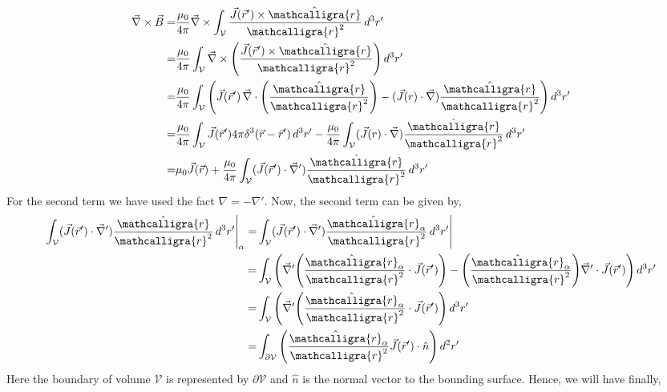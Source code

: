 \documentclass{article}
\newcommand{\scriptr}{\mathord{\mathcalligra{r}}}
\begin{document}
\begin{equation*}
    \begin{split}
        \vec{\nabla}\times \vec{B} = & \frac{\mu_0}{4\pi}\vec{\nabla}\times \int_{\mathcal{V}} \frac{\vec{J}(\vec{r}')\times\hat{\scriptr}}{\scriptr^2}\, d^3r'\\
        = &  \frac{\mu_0}{4\pi} \int_{\mathcal{V}} \vec{\nabla}\times \Bigg(\frac{\vec{J}(\vec{r}')\times \hat{\scriptr}}{\scriptr^2}\Bigg)\, d^3r'\\
        = &  \frac{\mu_0}{4\pi} \int_{\mathcal{V}} \Bigg( \vec{J}(\vec{r}') \, \vec{\nabla}\cdot \Bigg(\frac{\hat{\scriptr}}{\scriptr^2}\Bigg) - (\vec{J}(r)\cdot \vec{\nabla})\frac{\hat{\scriptr}}{\scriptr^2}\Bigg)\, d^3r'\\
        = & \frac{\mu_0}{4\pi} \int_{\mathcal{V}} \vec{J}(\vec{r}')4\pi \delta^3(\vec{r}-\vec{r}')\, d^3r' -  \frac{\mu_0}{4\pi} \int_{\mathcal{V}} (\vec{J}(r)\cdot \vec{\nabla})\frac{\hat{\scriptr}}{\scriptr^2}\, d^3r'\\
        = & \mu_0 \vec{J}(\vec{r}) + \frac{\mu_0}{4\pi}\int_{\mathcal{V}}(\vec{J}(\vec{r}')\cdot \vec{\nabla}')\frac{\hat{\scriptr}}{\scriptr^2}\, d^3 r'
    \end{split}
\end{equation*}
For the second term we have used the fact $\nabla = - \nabla'$. Now, the second term can be given by,
\begin{equation*}
    \begin{split}
    \int_{\mathcal{V}}(\vec{J}(\vec{r}')\cdot \vec{\nabla}')\frac{\hat{\scriptr}}{\scriptr^2}\, d^3 r'\Bigg|_\alpha = &  \int_{\mathcal{V}}(\vec{J}(\vec{r}')\cdot \vec{\nabla}')\frac{\hat{\scriptr}_\alpha}{\scriptr^2}\, d^3 r'\Bigg| \\
    = &  \int_{\mathcal{V}} \Bigg( \vec{\nabla}' \Bigg( \frac{\hat{\scriptr}_\alpha}{\scriptr^2}\cdot \vec{J}(\vec{r}')\Bigg) - \Bigg( \frac{\hat{\scriptr}_\alpha}{\scriptr^2}\Bigg) \vec{\nabla}'\cdot\vec{J}(\vec{r}') \Bigg)\, d^3r'\\
    = & \int_{\mathcal{V}} \Bigg( \vec{\nabla}' \Bigg( \frac{\hat{\scriptr}_\alpha}{\scriptr^2} \cdot\vec{J}(\vec{r}')\Bigg)\, d^3r'\\
    = & \int_{\partial \mathcal{V}}\Bigg( \frac{\hat{\scriptr}_\alpha}{\scriptr^2}\vec{J}(\vec{r}')\cdot \hat{n} \Bigg)\, d^2r'
    \end{split}
\end{equation*}
Here the boundary of volume $\mathcal{V}$ is represented by $\partial\mathcal{V}$ and $\hat{n}$ is the normal vector to the bounding surface. Hence, we will have finally,
\end{document}
